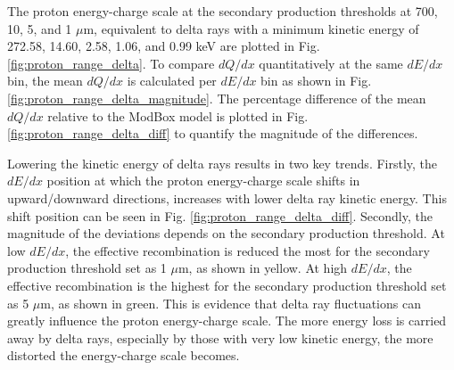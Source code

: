 The proton energy-charge scale at the secondary production thresholds at 700, 10, 5, and 1 $\mu$m, equivalent to delta rays with a minimum kinetic energy of 272.58, 14.60, 2.58, 1.06, and 0.99 keV are plotted in Fig. \ref{fig:proton_range_delta}. 
To compare $dQ/dx$ quantitatively at the same $dE/dx$ bin, the mean $dQ/dx$ is calculated per $dE/dx$ bin as shown in Fig. \ref{fig:proton_range_delta_magnitude}.
The percentage difference of the mean $dQ/dx$ relative to the ModBox model is plotted in Fig. \ref{fig:proton_range_delta_diff} to quantify the magnitude of the differences.

Lowering the kinetic energy of delta rays results in two key trends.                                                           
Firstly, the $dE/dx$ position at which the proton energy-charge scale shifts in upward/downward directions, increases with lower delta ray kinetic energy. 
This shift position can be seen in Fig. \ref{fig:proton_range_delta_diff}.
Secondly, the magnitude of the deviations depends on the secondary production threshold. 
At low $dE/dx$, the effective recombination is reduced the most for the secondary production threshold set as 1 $\mu$m, as shown in yellow.
At high $dE/dx$, the effective recombination is the highest for the secondary production threshold set as 5 $\mu$m, as shown in green.
This is evidence that delta ray fluctuations can greatly influence the proton energy-charge scale.
The more energy loss is carried away by delta rays, especially by those with very low kinetic energy, the more distorted the energy-charge scale becomes.


